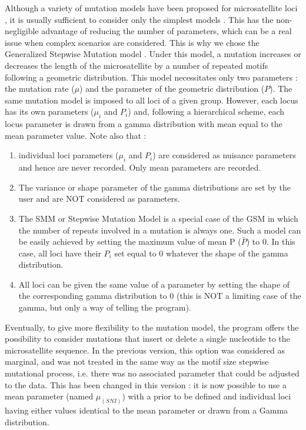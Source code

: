 Although a variety of mutation models have been proposed for microsatellite
loci \citep{W2003}, it is usually sufficient to consider only the
simplest models \citep{C2006}. This has the non-negligible advantage
of reducing the number of parameters, which can be a real issue when
complex scenarios are considered. This is why we chose the Generalized
Stepwise Mutation model \citep{E2002}. Under this model, a mutation
increases or decreases the length of the microsatellite by a number
of repeated motifs following a geometric distribution. This model
necessitates only two parameters : the mutation rate (\texttt{$\mu$})
and the parameter of the geometric distribution (\texttt{$P$}). The
same mutation model is imposed to all loci of a given group. However,
each locus has its own parameters (\texttt{$\mu_{i}$} and \texttt{$P_{i}$})
and, following a hierarchical scheme, each locus parameter is drawn
from a gamma distribution with mean equal to the mean parameter value.
Note also that :
\begin{enumerate}
\item individual loci parameters (\texttt{$\mu_{i}$} and \texttt{$P_{i}$})
are considered as nuisance parameters and hence are never recorded.
Only mean parameters are recorded.
\item The variance or shape parameter of the gamma distributions are set
by the user and are NOT considered as parameters.
\item The SMM or Stepwise Mutation Model is a special case of the GSM in
which the number of repeats involved in a mutation is always one.
Such a model can be easily achieved by setting the maximum value of
mean P ($\bar{P}$) to 0. In this case, all loci have their $P_{i}$
set equal to 0 whatever the shape of the gamma distribution.
\item All loci can be given the same value of a parameter by setting the
shape of the corresponding gamma distribution to 0 (this is NOT a
limiting case of the gamma, but only a way of telling the program).
\end{enumerate}
Eventually, to give more flexibility to the mutation model, the program
offers the possibility to consider mutations that insert or delete
a single nucleotide to the microsatellite sequence. In the previous
version, this option was considered as marginal, and was not treated
in the same way as the motif size stepwise mutational process, i.e.
there was no associated parameter that could be adjusted to the data.
This has been changed in this version : it is now possible to use
a mean parameter (named $\mu_{(SNI)}$) with a prior to be defined
and individual loci having either values identical to the mean parameter
or drawn from a Gamma distribution.


